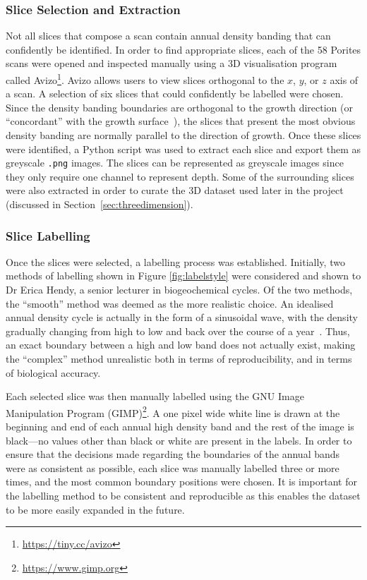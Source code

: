 \subsubsection{Slice Selection and Extraction}

Not all slices that compose a scan contain annual density banding that can confidently be identified. In order to find appropriate slices, each of the 58 Porites scans were opened and inspected manually using a 3D visualisation program called Avizo\footnote{\url{https://tiny.cc/avizo}}. Avizo allows users to view slices orthogonal to the $x$, $y$, or $z$ axis of a scan. A selection of six slices that could confidently be labelled were chosen. Since the density banding boundaries are orthogonal to the growth direction (or ``concordant'' with the growth surface~\cite{knutson}), the slices that present the most obvious density banding are normally parallel to the direction of growth. Once these slices were identified, a Python script was used to extract each slice and export them as greyscale \texttt{.png} images. The slices can be represented as greyscale images since they only require one channel to represent depth. Some of the surrounding slices were also extracted in order to curate the 3D dataset used later in the project (discussed in Section~\ref{sec:threedimension}).

\subsubsection{Slice Labelling}

Once the slices were selected, a labelling process was established. Initially, two methods of labelling shown in Figure \ref{fig:labelstyle} were considered and shown to Dr Erica Hendy, a senior lecturer in biogeochemical cycles. Of the two methods, the ``smooth'' method was deemed as the more realistic choice. An idealised annual density cycle is actually in the form of a sinusoidal wave, with the density gradually changing from high to low and back over the course of a year~\cite[p. 39]{coralsine}. Thus, an exact boundary between a high and low band does not actually exist, making the ``complex'' method unrealistic both in terms of reproducibility, and in terms of biological accuracy.

Each selected slice was then manually labelled using the GNU Image Manipulation Program (GIMP)\footnote{\url{https://www.gimp.org}}. A one pixel wide white line is drawn at the beginning and end of each annual high density band and the rest of the image is black---no values other than black or white are present in the labels. In order to ensure that the decisions made regarding the boundaries of the annual bands were as consistent as possible, each slice was manually labelled three or more times, and the most common boundary positions were chosen. It is important for the labelling method to be consistent and reproducible as this enables the dataset to be more easily expanded in the future.

